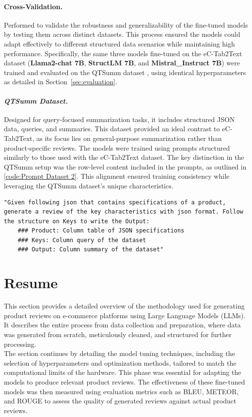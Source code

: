 \paragraph{Cross-Validation.} Performed to validate the robustness and generalizability of the fine-tuned models by testing them across distinct datasets. This process ensured the models could adapt effectively to different structured data scenarios while maintaining high performance. Specifically, the same three models fine-tuned on the eC-Tab2Text dataset (\textbf{Llama2-chat 7B}, \textbf{StructLM 7B}, and \textbf{Mistral\_Instruct 7B}) were trained and evaluated on the QTSumm dataset \citep{zhao2023qtsummqueryfocusedsummarizationtabular}, using identical hyperparameters as detailed in Section~\ref{sec:evaluation}.
\paragraph{\textit{QTSumm Dataset.}\label{par:Prompt QTSumm}\citep{zhao2023qtsummqueryfocusedsummarizationtabular}} Designed for query-focused summarization tasks, it includes structured JSON data, queries, and summaries. This dataset provided an ideal contrast to eC-Tab2Text, as its focus lies on general-purpose summarization rather than product-specific reviews. The models were trained using prompts structured similarly to those used with the eC-Tab2Text dataset. The key distinction in the QTSumm setup was the row-level content included in the prompts, as outlined in \ref{code:Prompt Dataset 2}. This alignment ensured training consistency while leveraging the QTSumm dataset's unique characteristics.

\begin{lstlisting}[style=textstyle, frame = single, caption=Prompt structuration for QTSumm, label=code:Prompt Dataset 2]
    "Given following json that contains specifications of a product, generate a review of the key characteristics with json format. Follow the structure on Keys to write the Output: 
    ### Product: Column table of JSON specifications
    ### Keys: Column query of the dataset
    ### Output: Column summary of the dataset"
    \end{lstlisting}

\section{Resume}
This section provides a detailed overview of the methodology used for generating product reviews on e-commerce platforms using Large Language Models (LLMs). It describes the entire process from data collection and preparation, where data was generated from scratch, meticulously cleaned, and structured for further processing.
\\

The section continues by detailing the model tuning techniques, including the selection of hyperparameters and optimization methods, tailored to match the computational limits of the hardware. This phase was essential for adapting the models to produce relevant product reviews. The effectiveness of these fine-tuned models was then measured using evaluation metrics such as BLEU, METEOR, and ROUGE to assess the quality of generated reviews against actual product reviews.